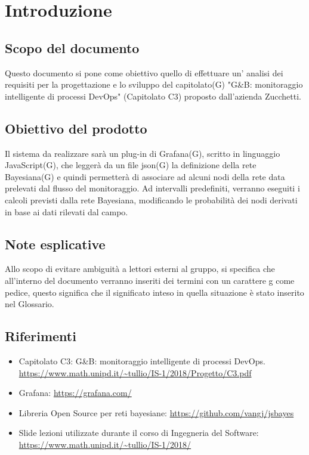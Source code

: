 \section{Introduzione}
		\subsection{Scopo del documento}			
Questo documento si pone come obiettivo quello di effettuare un' analisi dei requisiti per la progettazione e lo sviluppo del capitolato(G) "G\&B: monitoraggio intelligente di processi DevOps" (Capitolato C3) proposto dall'azienda Zucchetti.


		\subsection{Obiettivo del prodotto}

Il sistema da realizzare sarà  un plug-in di Grafana(G), scritto in linguaggio JavaScript(G), che leggerà da un file json(G) la definizione della rete Bayesiana(G) e quindi permetterà di associare ad alcuni nodi della rete data prelevati dal flusso del monitoraggio.
Ad intervalli predefiniti, verranno eseguiti i calcoli previsti dalla rete Bayesiana, modificando le probabilità dei nodi derivati in base ai dati rilevati dal campo.


		\subsection{Note esplicative}

Allo scopo di evitare ambiguità a lettori esterni al gruppo, si specifica che all'interno del documento verranno inseriti dei termini con un carattere g come pedice, questo significa che il significato inteso in quella situazione è stato inserito nel Glossario.


		\subsection{Riferimenti}

		\begin{itemize}
			\item Capitolato C3: G\&B: monitoraggio intelligente di processi DevOps.\newline
			\url{https://www.math.unipd.it/~tullio/IS-1/2018/Progetto/C3.pdf}
			\item Grafana:\newline
            \url{https://grafana.com/}
			\item Libreria Open Source per reti bayesiane:\newline
			\url{https://github.com/vangj/jsbayes}
			\item Slide lezioni utilizzate durante il corso di Ingegneria del Software:\newline
			\url{https://www.math.unipd.it/~tullio/IS-1/2018/}
		\end{itemize}
				

\newpage